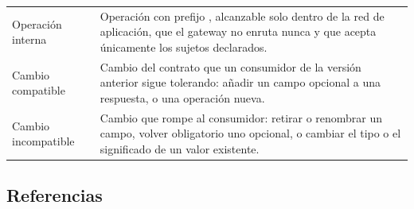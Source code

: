 \documentclass[11pt,a4paper]{article}
\begin{document}
\begin{longtable}{L{3.6cm} L{11.0cm}}
Operación interna & Operación con prefijo , alcanzable solo dentro de la red de aplicación, que el gateway no enruta nunca y que acepta únicamente los sujetos declarados. \\
Cambio compatible & Cambio del contrato que un consumidor de la versión anterior sigue tolerando: añadir un campo opcional a una respuesta, o una operación nueva. \\
Cambio incompatible & Cambio que rompe al consumidor: retirar o renombrar un campo, volver obligatorio uno opcional, o cambiar el tipo o el significado de un valor existente. \\
\end{longtable}

\subsection{Referencias}
\end{document}
